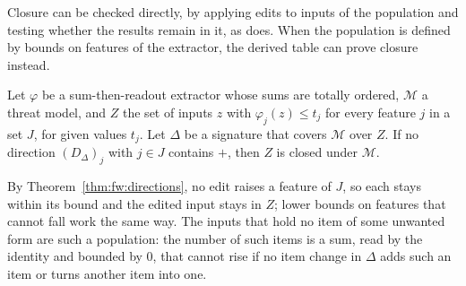 Closure can be checked directly, by applying edits to inputs of the population and testing whether the results remain
in it, as  does. When the population is defined by bounds on features of the extractor,
the derived table can prove closure instead.

\lemma[Closure]
\label{lem:fw:closure}
{
Let $\varphi$ be a sum-then-readout extractor whose sums are totally ordered, $\mathcal{M}$ a threat model, and $Z$
the set of inputs $z$ with $\varphi_j(z) \le t_j$ for every feature $j$ in a set $J$, for given values $t_j$. Let
$\Delta$ be a signature that covers $\mathcal{M}$ over $Z$. If no direction $(D_\Delta)_j$ with $j \in J$ contains
$+$, then $Z$ is closed under $\mathcal{M}$.
}

\noindent By Theorem~\ref{thm:fw:directions}, no edit raises a feature of $J$, so each stays within its bound and the
edited input stays in $Z$; lower bounds on features that cannot fall work the same way. The inputs that hold no item
of some unwanted form are such a population: the number of such items is a sum, read by the identity and bounded by 0, that cannot rise if no
item change in $\Delta$ adds such an item or turns another item into one.

